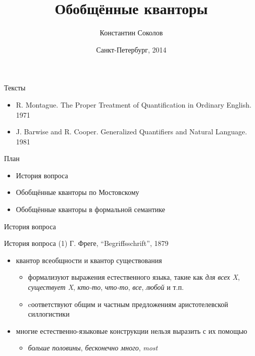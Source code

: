 \documentclass{beamer}
\begin{document}
\title{\Large{Обобщённые кванторы}}
\author{Константин Соколов}
\date{Санкт-Петербург, 2014} 
\begin{frame}
    \thispagestyle{empty}
    \titlepage
\end{frame}

\begin{frame}{Тексты}
\setcounter{framenumber}{1}
\begin{itemize}
    \item R. Montague. The Proper Treatment of Quantification in Ordinary English. 1971
	\item J. Barwise and R. Cooper. Generalized Quantifiers and Natural Language. 1981
\end{itemize}
\end{frame}

\begin{frame}{План}
\begin{itemize}
    \item История вопроса
	\item Обобщённые кванторы по Мостовскому
	\item Обобщённые кванторы в формальной семантике
\end{itemize}
\end{frame}

\begin{frame}{}
\begin{center}
История вопроса
\end{center}
\end{frame}

\begin{frame}{История вопроса (1)}
Г. Фреге, ``Begriffsschrift'', 1879
\bigskip
\begin{itemize}
	\item квантор всеобщности и квантор существования 
	    \medskip
	    \begin{itemize}
	        \item формализуют выражения естественного языка, такие как \textit{для всех X}, \textit{существует X}, \textit{кто-то}, \textit{что-то}, \textit{все}, \textit{любой} и т.п.
	        \medskip
        	\item cоответствуют общим и частным предложениям аристотелевской силлогистики
        \end{itemize}
    \bigskip
    \item многие естественно-языковые конструкции нельзя выразить с их помощью
        \medskip
        \begin{itemize}
            \item \textit{больше половины}, \textit{бесконечно много}, \textit{most}
        \end{itemize}
\end{itemize}
\end{frame}
\end{document}
